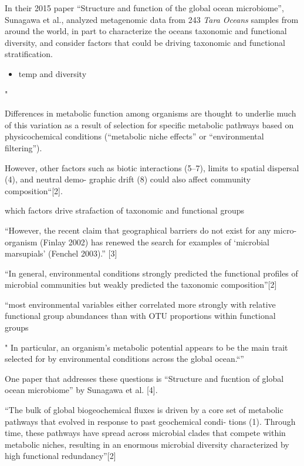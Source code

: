 \documentclass[12pt,a4paper,]{article}
\providecommand{\tightlist}{%
  \setlength{\itemsep}{0pt}\setlength{\parskip}{0pt}}
\begin{document}
In their 2015 paper ``Structure and function of the global ocean
microbiome'', Sunagawa et al., analyzed metagenomic data from 243
\emph{Tara Oceans} samples from around the world, in part to
characterize the oceans taxonomic and functional diversity, and consider
factors that could be driving taxonomic and functional stratification.

\begin{itemize}
\tightlist
\item
  temp and diversity
\end{itemize}

"

Differences in metabolic function among organisms are thought to
underlie much of this variation as a result of selection for specific
metabolic pathways based on physicochemical conditions (``metabolic
niche effects'' or ``environmental filtering'').

However, other factors such as biotic interactions (5--7), limits to
spatial dispersal (4), and neutral demo- graphic drift (8) could also
affect community composition``{[}2{]}.

which factors drive strafaction of taxonomic and functional groups

``However, the recent claim that geographical barriers do not exist for
any micro-organism (Finlay 2002) has renewed the search for examples of
`microbial marsupials' (Fenchel 2003).'' {[}3{]}

``In general, environmental conditions strongly predicted the functional
profiles of microbial communities but weakly predicted the taxonomic
composition''{[}2{]}

``most environmental variables either correlated more strongly with
relative functional group abundances than with OTU proportions within
functional groups

" In particular, an organism's metabolic potential appears to be the
main trait selected for by environmental conditions across the global
ocean.``''

One paper that addresses these questions is ``Structure and fucntion of
global ocean microbiome'' by Sunagawa et al. {[}4{]}.

``The bulk of global biogeochemical fluxes is driven by a core set of
metabolic pathways that evolved in response to past geochemical condi-
tions (1). Through time, these pathways have spread across microbial
clades that compete within metabolic niches, resulting in an enormous
microbial diversity characterized by high functional redundancy''{[}2{]}
\end{document}
